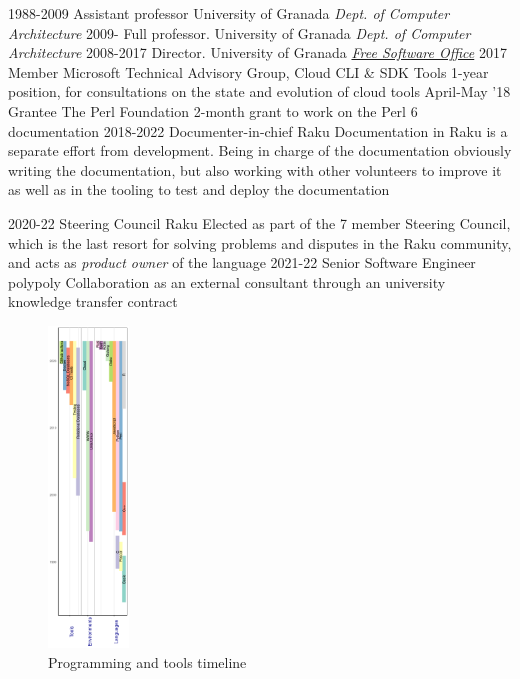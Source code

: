 \documentclass[]{friggeri-jj-cv}
\begin{document}
\begin{entrylist}
  \entry
    {1988-2009}
    {Assistant professor}
    {University of Granada}
    {\emph{Dept. of Computer Architecture}}
  \entry
    {2009-}
    {Full professor.}
    {University of Granada}
    {\emph{Dept. of Computer Architecture}}
    \entry
    {2008-2017}
    {Director.}
    {University of Granada}
    {\href{http://osl.ugr.es}{\emph{Free Software Office}}}
    \entry
    {2017}
    {Member}
    {Microsoft Technical Advisory Group, Cloud CLI \& SDK Tools}
    {1-year position, for consultations on the state and evolution of
      cloud tools}
    \entry
    {April-May '18}
    {Grantee}
    {The Perl Foundation}
    {2-month grant to work on the Perl 6 documentation}
    \entry
    {2018-2022}
    {Documenter-in-chief}
    {Raku}
    {Documentation in Raku is a separate effort from
      development. Being in charge of the documentation obviously
      writing the documentation, but also working with other
      volunteers to improve it as well as in the tooling to test and
      deploy the documentation}

        \entry
    {2020-22}
    {Steering Council}
    {Raku}
    {Elected as part of the 7 member Steering Council, which is the
      last resort for solving problems and disputes in the Raku
      community, and acts as {\em product owner} of the language}
    \entry
    {2021-22}
    {Senior Software Engineer}
    {polypoly}
    {Collaboration as an external consultant through an university
      knowledge transfer contract}

\end{entrylist}

\begin{figure}
    \centering
    \includegraphics[width=0.19\textwidth]{img/timeline.png}
    \caption{Programming and tools timeline}
\end{figure}
\end{document}
